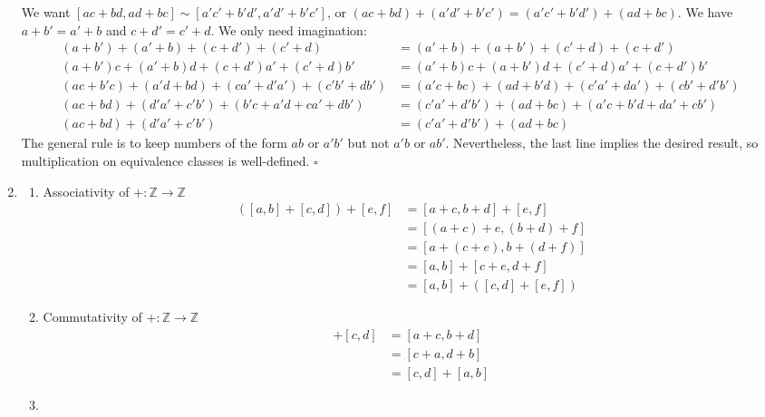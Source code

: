 \documentclass{article}
\newcommand{\Z}{\mathbb{Z}}
\begin{document}
\begin{enumerate}[label=\textbf{(\alph*)}]
{\begin{enumerate}[label=(\arabic*)]
{          We want $[ac+bd,ad+bc]\sim[a'c'+b'd',a'd'+b'c']$, or
          $(ac+bd)+(a'd'+b'c')=(a'c'+b'd')+(ad+bc)$. We have $a+b'=a'+b$ and
          $c+d'=c'+d$. We only need imagination:
          \begin{align*}
            (a+b')+(a'+b)+(c+d')+(c'+d)
                              &= (a'+b)+(a+b')+(c'+d)+(c+d') \\
            (a+b')c+(a'+b)d+(c+d')a'+(c'+d)b'
                              &= (a'+b)c+(a+b')d+(c'+d)a'+(c+d')b' \\
            (ac+b'c)+(a'd+bd)+(ca'+d'a')+(c'b'+db')
                              &= (a'c+bc)+(ad+b'd)+(c'a'+da')+ (cb'+d'b') \\
            (ac+bd)+(d'a'+c'b')+(b'c+a'd+ca'+db')
                              &= (c'a'+d'b')+(ad+bc)+(a'c+b'd+da'+cb') \\
            (ac+bd)+(d'a'+c'b')
                              &= (c'a'+d'b')+(ad+bc)
          \end{align*}
          The general rule is to keep numbers of the form $ab$ or $a'b'$ but not
          $a'b$ or $ab'$. Nevertheless, the last line implies the desired
          result, so multiplication on equivalence classes is well-defined.
          \hfill $\square$
        }
      \end{enumerate}
    }
    \item{
      \begin{enumerate}[label=(\arabic*)]
        \item{
          Associativity of $+:\Z\to\Z$
          \begin{align*}
            ([a,b]+[c,d])+[e,f] &= [a+c,b+d]+[e,f]  \\
                                &= [(a+c)+e,(b+d)+f]\\
                                &= [a+(c+e),b+(d+f)]\\
                                &= [a,b]+[c+e,d+f]  \\
                                &= [a,b]+([c,d]+[e,f])
          \end{align*}
        }
        \item{
          Commutativity of $+:\Z\to\Z$
          \begin{align*}
            [a,b]+[c,d] &= [a+c,b+d]\\
                        &=[c+a,d+b] \\
                        &=[c,d]+[a,b]
          \end{align*}
        }
        \item{
}
\end{enumerate}}
\end{enumerate}
\end{document}
